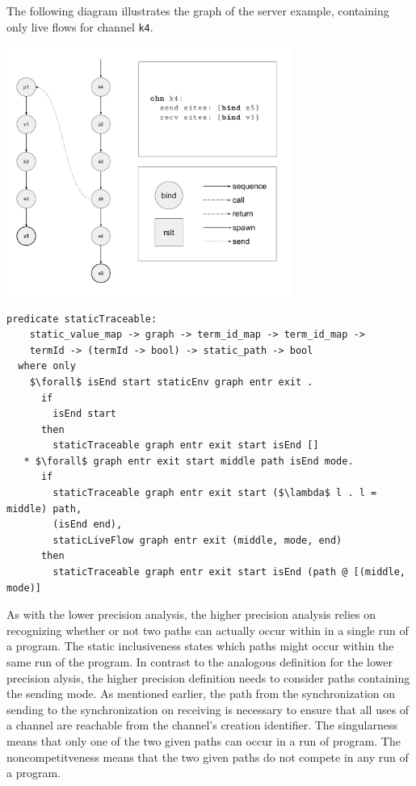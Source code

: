 \documentclass[letterpaper, 11pt]{extarticle}
\begin{document}
The following diagram illustrates the graph of the server example,
containing only live flows for channel \lstinline{k4}. \

\includegraphics[width=0.7\textwidth]{cml-graph-k4.pdf}

\begin{lstlisting}[language=logic, mathescape]
  predicate staticTraceable:
    static_value_map -> graph -> term_id_map -> term_id_map ->
    termId -> (termId -> bool) -> static_path -> bool
  where only
    $\forall$ isEnd start staticEnv graph entr exit .
      if
        isEnd start
      then
        staticTraceable graph entr exit start isEnd []
   * $\forall$ graph entr exit start middle path isEnd mode. 
      if
        staticTraceable graph entr exit start ($\lambda$ l . l = middle) path, 
        (isEnd end),
        staticLiveFlow graph entr exit (middle, mode, end) 
      then
        staticTraceable graph entr exit start isEnd (path @ [(middle, mode)]
\end{lstlisting}

As with the lower precision analysis, the higher precision analysis relies on recognizing
whether or not two paths can actually occur within in a single run of a program. The static
inclusiveness states which paths might occur within the same run of the program.
In contrast to the analogous definition for the lower precision
alysis, the higher precision definition needs to consider paths containing the
sending mode.  As mentioned earlier, the path from the synchronization on sending to the
synchronization on receiving is necessary to ensure that all uses of a channel are reachable
from the channel's creation identifier.  The singularness means that only one of the two
given paths can occur in a run of program.  The noncompetitveness means that the two
given paths do not compete in any run of a program. 
\end{document}
